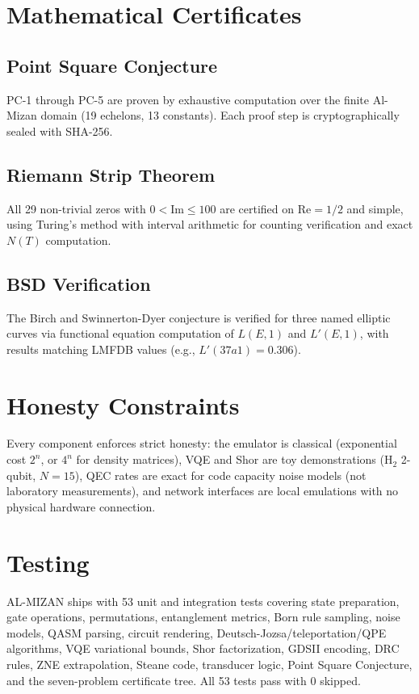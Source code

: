 \documentclass[preprint,12pt]{elsarticle}
\begin{document}
\section{Mathematical Certificates}

\subsection{Point Square Conjecture}

PC-1 through PC-5 are proven by exhaustive computation over the finite Al-Mizan domain (19 echelons, 13 constants). Each proof step is cryptographically sealed with SHA-256.

\subsection{Riemann Strip Theorem}

All 29 non-trivial zeros with $0 < \mathrm{Im} \leq 100$ are certified on $\mathrm{Re} = 1/2$ and simple, using Turing's method with interval arithmetic for counting verification and exact $N(T)$ computation.

\subsection{BSD Verification}

The Birch and Swinnerton-Dyer conjecture is verified for three named elliptic curves via functional equation computation of $L(E,1)$ and $L'(E,1)$, with results matching LMFDB values (e.g., $L'(37a1) = 0.306$).

\section{Honesty Constraints}

Every component enforces strict honesty: the emulator is classical (exponential cost $2^n$, or $4^n$ for density matrices), VQE and Shor are toy demonstrations (H$_2$ 2-qubit, $N=15$), QEC rates are exact for code capacity noise models (not laboratory measurements), and network interfaces are local emulations with no physical hardware connection.

\section{Testing}

AL-MIZAN ships with 53 unit and integration tests covering state preparation, gate operations, permutations, entanglement metrics, Born rule sampling, noise models, QASM parsing, circuit rendering, Deutsch-Jozsa/teleportation/QPE algorithms, VQE variational bounds, Shor factorization, GDSII encoding, DRC rules, ZNE extrapolation, Steane code, transducer logic, Point Square Conjecture, and the seven-problem certificate tree. All 53 tests pass with 0 skipped.
\end{document}

